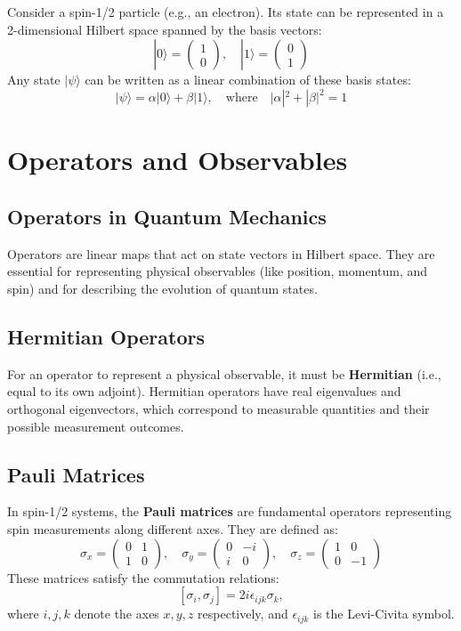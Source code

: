 \documentclass[12pt]{article}
\begin{document}
Consider a spin-1/2 particle (e.g., an electron). Its state can be represented in a 2-dimensional Hilbert space spanned by the basis vectors:
\[
|0\rangle = \begin{pmatrix} 1 \\ 0 \end{pmatrix}, \quad |1\rangle = \begin{pmatrix} 0 \\ 1 \end{pmatrix}
\]
Any state \( |\psi\rangle \) can be written as a linear combination of these basis states:
\[
|\psi\rangle = \alpha |0\rangle + \beta |1\rangle, \quad \text{where} \quad |\alpha|^2 + |\beta|^2 = 1
\]

\section{Operators and Observables}

\subsection{Operators in Quantum Mechanics}

Operators are linear maps that act on state vectors in Hilbert space. They are essential for representing physical observables (like position, momentum, and spin) and for describing the evolution of quantum states.

\subsection{Hermitian Operators}

For an operator to represent a physical observable, it must be \textbf{Hermitian} (i.e., equal to its own adjoint). Hermitian operators have real eigenvalues and orthogonal eigenvectors, which correspond to measurable quantities and their possible measurement outcomes.

\subsection{Pauli Matrices}

In spin-1/2 systems, the \textbf{Pauli matrices} are fundamental operators representing spin measurements along different axes. They are defined as:
\[
\sigma_x = \begin{pmatrix} 0 & 1 \\ 1 & 0 \end{pmatrix}, \quad \sigma_y = \begin{pmatrix} 0 & -i \\ i & 0 \end{pmatrix}, \quad \sigma_z = \begin{pmatrix} 1 & 0 \\ 0 & -1 \end{pmatrix}
\]
These matrices satisfy the commutation relations:
\[
[\sigma_i, \sigma_j] = 2i\epsilon_{ijk} \sigma_k,
\]
where \( i, j, k \) denote the axes \( x, y, z \) respectively, and \( \epsilon_{ijk} \) is the Levi-Civita symbol.
\end{document}
